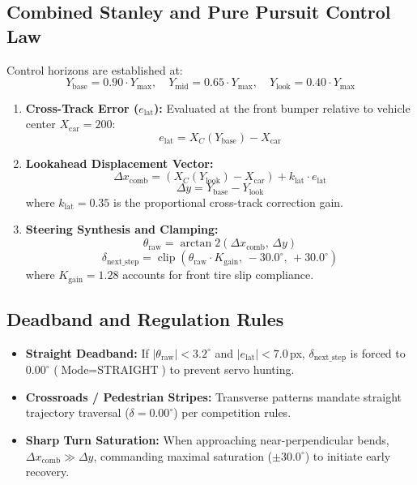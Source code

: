\documentclass[10pt,journal,compsoc]{IEEEtran}
\begin{document}
\subsection{Combined Stanley and Pure Pursuit Control Law}
Control horizons are established at:
\begin{equation}
Y_{\text{base}} = 0.90 \cdot Y_{\max}, \quad Y_{\text{mid}} = 0.65 \cdot Y_{\max}, \quad Y_{\text{look}} = 0.40 \cdot Y_{\max}
\end{equation}
\begin{enumerate}
    \item \textbf{Cross-Track Error ($e_{\text{lat}}$):} Evaluated at the front bumper relative to vehicle center $X_{\text{car}} = 200$:
    \begin{equation}
    e_{\text{lat}} = X_C(Y_{\text{base}}) - X_{\text{car}}
    \end{equation}
    \item \textbf{Lookahead Displacement Vector:}
    \begin{equation}
    \Delta x_{\text{comb}} = (X_C(Y_{\text{look}}) - X_{\text{car}}) + k_{\text{lat}} \cdot e_{\text{lat}}
    \end{equation}
    \begin{equation}
    \Delta y = Y_{\text{base}} - Y_{\text{look}}
    \end{equation}
    where $k_{\text{lat}} = 0.35$ is the proportional cross-track correction gain.
    \item \textbf{Steering Synthesis and Clamping:}
    \begin{equation}
    \theta_{\text{raw}} = \arctan2\left(\Delta x_{\text{comb}}, \, \Delta y\right)
    \end{equation}
    \begin{equation}
    \delta_{\text{next\_step}} = \operatorname{clip}\left(\theta_{\text{raw}} \cdot K_{\text{gain}}, \, -30.0^\circ, \, +30.0^\circ\right)
    \end{equation}
    where $K_{\text{gain}} = 1.28$ accounts for front tire slip compliance.
\end{enumerate}

\subsection{Deadband and Regulation Rules}
\begin{itemize}
    \item \textbf{Straight Deadband:} If $|\theta_{\text{raw}}| < 3.2^\circ$ and $|e_{\text{lat}}| < 7.0$\,px, $\delta_{\text{next\_step}}$ is forced to $0.00^\circ$ ($\text{Mode} = \text{STRAIGHT}$) to prevent servo hunting.
    \item \textbf{Crossroads / Pedestrian Stripes:} Transverse patterns mandate straight trajectory traversal ($\delta = 0.00^\circ$) per competition rules.
    \item \textbf{Sharp Turn Saturation:} When approaching near-perpendicular bends, $\Delta x_{\text{comb}} \gg \Delta y$, commanding maximal saturation ($\pm 30.0^\circ$) to initiate early recovery.
\end{itemize}
\end{document}
